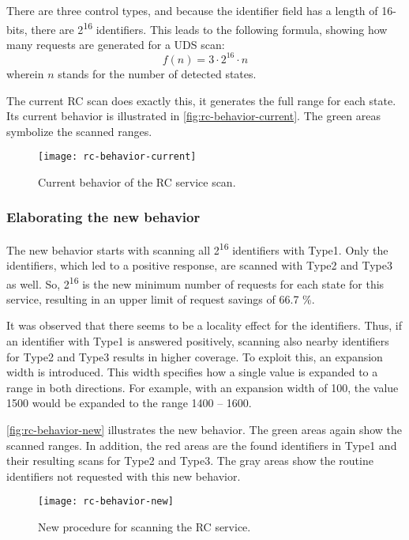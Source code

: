 There are three control types, and because the identifier field has a length of 16-bits, there are 2\textsuperscript{16} identifiers. This leads to the following formula, showing how many requests are generated for a UDS scan:
\[f(n)=3 \cdot 2^{16} \cdot n\]
wherein $n$ stands for the number of detected states.

The current RC scan does exactly this, it generates the full range for each state. Its current behavior is illustrated in \autoref{fig:rc-behavior-current}. The green areas symbolize the scanned ranges.

\begin{figure}[h]
    \centering
    \texttt{[image: rc-behavior-current]}
    \caption{Current behavior of the RC service scan.}
    \label{fig:rc-behavior-current}
\end{figure}

\subsubsection{Elaborating the new behavior}
\label{subsubsec:rc-elaborating}

The new behavior starts with scanning all 2\textsuperscript{16} identifiers with Type1. Only the identifiers, which led to a positive response, are scanned with Type2 and Type3 as well. So, 2\textsuperscript{16} is the new minimum number of requests for each state for this service, resulting in an upper limit of request savings of 66.7 \%.

It was observed that there seems to be a locality effect for the identifiers. Thus, if an identifier with Type1 is answered positively, scanning also nearby identifiers for Type2 and Type3 results in higher coverage. To exploit this, an expansion width is introduced. This width specifies how a single value is expanded to a range in both directions. For example, with an expansion width of 100, the value 1500 would be expanded to the range 1400 – 1600.

\autoref{fig:rc-behavior-new} illustrates the new behavior. The green areas again show the scanned ranges. In addition, the red areas are the found identifiers in Type1 and their resulting scans for Type2 and Type3. The gray areas show the routine identifiers not requested with this new behavior.

\begin{figure}[h]
    \centering
    \texttt{[image: rc-behavior-new]}
    \caption{New procedure for scanning the RC service.}
    \label{fig:rc-behavior-new}
\end{figure}

